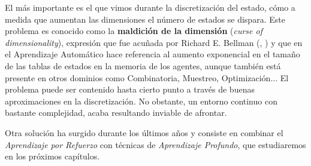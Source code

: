 El más importante es el que vimos durante la discretización del estado, cómo a medida que aumentan las dimensiones el número de estados se dispara. Este problema es conocido como la \textbf{maldición de la dimensión} (\textit{curse of dimensionality}), expresión que fue acuñada por Richard E. Bellman (\citet{bellman1957dynamic}, \citet{bellman1961adaptive}) y que en el Aprendizaje Automático hace referencia al aumento exponencial en el tamaño de las tablas de estados en la memoria de los agentes, aunque también está presente en otros dominios como Combinatoria, Muestreo, Optimización... El problema puede ser contenido hasta cierto punto a través de buenas aproximaciones en la discretización. No obstante, un entorno continuo con bastante complejidad, acaba resultando inviable de afrontar.

Otra solución ha surgido durante los últimos años y consiste en combinar el \textit{Aprendizaje por Refuerzo} con técnicas de \textit{Aprendizaje Profundo}, que estudiaremos en los próximos capítulos.
